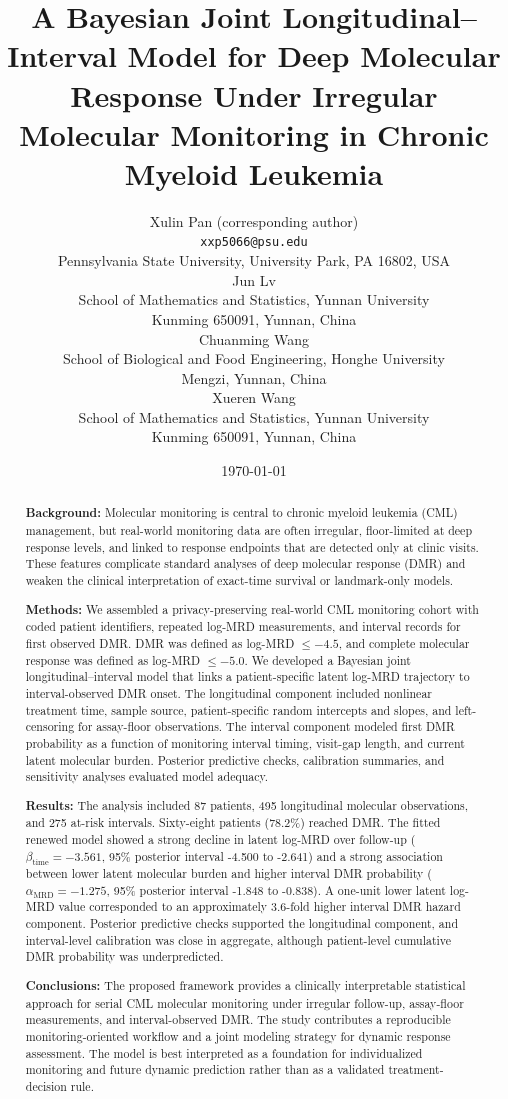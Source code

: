 \documentclass[11pt]{article}
\title{A Bayesian Joint Longitudinal--Interval Model for Deep Molecular Response Under Irregular Molecular Monitoring in Chronic Myeloid Leukemia}
\author{
Xulin Pan (corresponding author)\\
\texttt{xxp5066@psu.edu}\\
Pennsylvania State University, University Park, PA 16802, USA\\[0.5em]
Jun Lv\\
School of Mathematics and Statistics, Yunnan University\\
Kunming 650091, Yunnan, China\\[0.5em]
Chuanming Wang\\
School of Biological and Food Engineering, Honghe University\\
Mengzi, Yunnan, China\\[0.5em]
Xueren Wang\\
School of Mathematics and Statistics, Yunnan University\\
Kunming 650091, Yunnan, China\\[0.5em]
}
\date{\today}
\begin{document}
\maketitle

\begin{abstract}
\textbf{Background:}
Molecular monitoring is central to chronic myeloid leukemia (CML) management, but real-world monitoring data are often irregular, floor-limited at deep response levels, and linked to response endpoints that are detected only at clinic visits. These features complicate standard analyses of deep molecular response (DMR) and weaken the clinical interpretation of exact-time survival or landmark-only models.

\textbf{Methods:}
We assembled a privacy-preserving real-world CML monitoring cohort with coded patient identifiers, repeated log-MRD measurements, and interval records for first observed DMR. DMR was defined as log-MRD \(\leq -4.5\), and complete molecular response was defined as log-MRD \(\leq -5.0\). We developed a Bayesian joint longitudinal--interval model that links a patient-specific latent log-MRD trajectory to interval-observed DMR onset. The longitudinal component included nonlinear treatment time, sample source, patient-specific random intercepts and slopes, and left-censoring for assay-floor observations. The interval component modeled first DMR probability as a function of monitoring interval timing, visit-gap length, and current latent molecular burden. Posterior predictive checks, calibration summaries, and sensitivity analyses evaluated model adequacy.

\textbf{Results:}
The analysis included 87 patients, 495 longitudinal molecular observations, and 275 at-risk intervals. Sixty-eight patients (78.2\%) reached DMR. The fitted renewed model showed a strong decline in latent log-MRD over follow-up (\(\beta_{\mathrm{time}}=-3.561\), 95\% posterior interval -4.500 to -2.641) and a strong association between lower latent molecular burden and higher interval DMR probability (\(\alpha_{\mathrm{MRD}}=-1.275\), 95\% posterior interval -1.848 to -0.838). A one-unit lower latent log-MRD value corresponded to an approximately 3.6-fold higher interval DMR hazard component. Posterior predictive checks supported the longitudinal component, and interval-level calibration was close in aggregate, although patient-level cumulative DMR probability was underpredicted.

\textbf{Conclusions:}
The proposed framework provides a clinically interpretable statistical approach for serial CML molecular monitoring under irregular follow-up, assay-floor measurements, and interval-observed DMR. The study contributes a reproducible monitoring-oriented workflow and a joint modeling strategy for dynamic response assessment. The model is best interpreted as a foundation for individualized monitoring and future dynamic prediction rather than as a validated treatment-decision rule.
\end{abstract}
\end{document}
